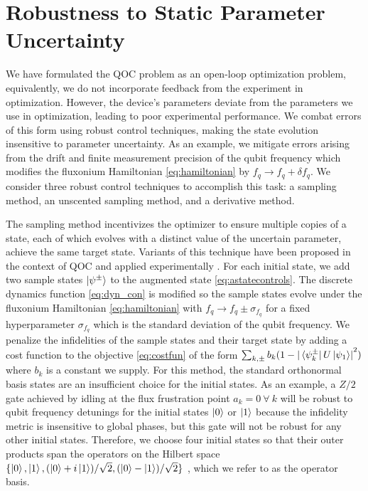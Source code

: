 \section{Robustness to Static Parameter Uncertainty \label{sec:static}}
We have formulated the QOC
problem as an open-loop optimization problem, equivalently,
we do not incorporate feedback from the experiment in optimization.
However, the device's parameters deviate from the parameters we use in optimization,
leading to poor experimental performance. We combat errors
of this form using robust control techniques,
making the state evolution insensitive
to parameter uncertainty. As an example,
we mitigate errors arising from the drift and finite measurement
precision of the qubit frequency which modifies the fluxonium Hamiltonian
\eqref{eq:hamiltonian} by $f_{q} \rightarrow f_{q} + \delta f_{q}$.
We consider three robust control techniques to accomplish this task:
a sampling method, an unscented sampling method,
and a derivative method.

The sampling method incentivizes the optimizer
to ensure multiple copies of a state, each of which evolves
with a distinct value of the uncertain parameter, achieve
the same target state. Variants of this technique have been proposed
in the context of QOC
\cite{allen2019robust, ball2020software, khaneja2005optimal,
  reinhold2019controlling, rembold2020introduction} and applied
experimentally \cite{carvalho2020error}.
For each initial state,
we add two sample states $\ket{\psi^{\pm}}$
to the augmented state \eqref{eq:astatecontrols}. The discrete dynamics
function \eqref{eq:dyn_con} is modified
so the sample states evolve under the fluxonium Hamiltonian \eqref{eq:hamiltonian}
with $f_{q} \rightarrow f_{q} \pm \sigma_{f_{q}}$ for a fixed
hyperparameter $\sigma_{f_{q}}$ which is the standard deviation of the qubit frequency.
We penalize the infidelities of the sample states and their target state
by adding a cost function to the objective \eqref{eq:costfun} of the form
$\sum_{k, \pm} b_{k} (1 - {\lvert \bra*{\psi^{\pm}_{k}}U\ket*{\psi_{1}} \rvert}^{2})$
where $b_{k}$ is a constant we supply.
For this method, the standard orthonormal basis states are an insufficient choice
for the initial states. As an example, a $Z/2$ gate achieved by idling
at the flux frustration point $a_{k} = 0 \ \forall \ k$
will be robust to qubit frequency detunings for the initial states $\ket{0}$
or $\ket{1}$ because the infidelity metric is insensitive to global phases,
but this gate will not be robust for any other initial states.
Therefore, we choose four initial states
so that their outer products
span the operators on the Hilbert space
$\{\ket{0}, \ket{1}, (\ket{0} + i\ket{1}) / \sqrt{2},
(\ket{0} - \ket{1}) / \sqrt{2}\}$ \cite{chow2009randomized},
which we refer to as the operator basis.

